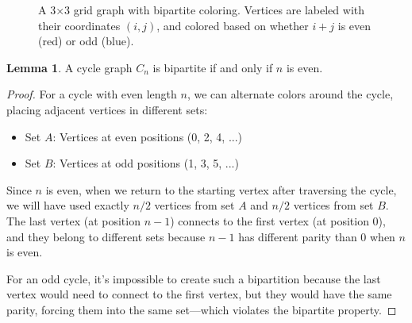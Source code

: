 \documentclass{article}
\theoremstyle{definition}
\newtheorem{lemma}{Lemma}
\begin{document}
\begin{figure}[h]
\centering
{}
\caption{A 3×3 grid graph with bipartite coloring. Vertices are labeled with their coordinates $(i,j)$, and colored based on whether $i+j$ is even (red) or odd (blue).}
\label{fig:grid-bipartite}
\end{figure}


\begin{lemma}
A cycle graph $C_n$ is bipartite if and only if $n$ is even.
\end{lemma}

\begin{proof}
For a cycle with even length $n$, we can alternate colors around the cycle, placing adjacent vertices in different sets:
\begin{itemize}
    \item Set $A$: Vertices at even positions (0, 2, 4, ...)
    \item Set $B$: Vertices at odd positions (1, 3, 5, ...)
\end{itemize}

Since $n$ is even, when we return to the starting vertex after traversing the cycle, we will have used exactly $n/2$ vertices from set $A$ and $n/2$ vertices from set $B$. The last vertex (at position $n-1$) connects to the first vertex (at position 0), and they belong to different sets because $n-1$ has different parity than 0 when $n$ is even.

For an odd cycle, it's impossible to create such a bipartition because the last vertex would need to connect to the first vertex, but they would have the same parity, forcing them into the same set—which violates the bipartite property.
\end{proof}
\end{document}
